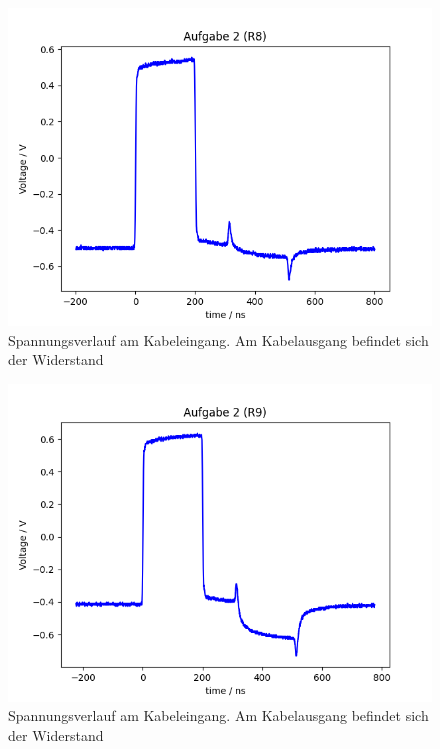 \documentclass{article}
\begin{document}
\begin{figure}[H]
\centering
\caption{Spannungsverlauf am Kabeleingang. Am Kabelausgang befindet sich der Widerstand }
\label{fig:task2_R8}
\includegraphics[scale=0.6]{bilder/task2/task2_R8.png}
\end{figure}




\begin{figure}[H]
\centering
\caption{Spannungsverlauf am Kabeleingang. Am Kabelausgang befindet sich der Widerstand }
\label{fig:task2_R9}
\includegraphics[scale=0.6]{bilder/task2/task2_R9.png}
\end{figure}
\end{document}
